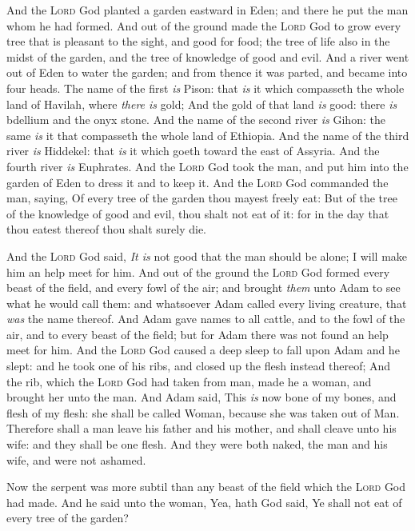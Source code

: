 \documentclass[11pt,letterpaper,oneside]{memoir}
\begin{document}
And the \textsc{Lord} God planted a garden eastward in Eden; and there he
put the man whom he had formed. And out of the ground made the
\textsc{Lord} God to grow every tree that is pleasant to the sight, and
good for food; the tree of life also in the midst of the garden, and the
tree of knowledge of good and evil. And a river went out of Eden to
water the garden; and from thence it was parted, and became into four
heads. The name of the first \emph{is} Pison: that \emph{is} it which
compasseth the whole land of Havilah, where \emph{there is} gold; And
the gold of that land \emph{is} good: there \emph{is} bdellium and the
onyx stone. And the name of the second river \emph{is} Gihon: the same
\emph{is} it that compasseth the whole land of Ethiopia. And the name of
the third river \emph{is} Hiddekel: that \emph{is} it which goeth toward
the east of Assyria. And the fourth river \emph{is} Euphrates. And the
\textsc{Lord} God took the man, and put him into the garden of Eden to
dress it and to keep it. And the \textsc{Lord} God commanded the man,
saying, Of every tree of the garden thou mayest freely eat: But of the
tree of the knowledge of good and evil, thou shalt not eat of it: for in
the day that thou eatest thereof thou shalt surely die.

And the \textsc{Lord} God said, \emph{It is} not good that the man should
be alone; I will make him an help meet for him. And out of the ground
the \textsc{Lord} God formed every beast of the field, and every fowl of
the air; and brought \emph{them} unto Adam to see what he would call
them: and whatsoever Adam called every living creature, that \emph{was}
the name thereof. And Adam gave names to all cattle, and to the fowl of
the air, and to every beast of the field; but for Adam there was not
found an help meet for him. And the \textsc{Lord} God caused a deep sleep
to fall upon Adam and he slept: and he took one of his ribs, and closed
up the flesh instead thereof; And the rib, which the \textsc{Lord} God had
taken from man, made he a woman, and brought her unto the man. And Adam
said, This \emph{is} now bone of my bones, and flesh of my flesh: she
shall be called Woman, because she was taken out of Man. Therefore shall
a man leave his father and his mother, and shall cleave unto his wife:
and they shall be one flesh. And they were both naked, the man and his
wife, and were not ashamed.

Now the serpent was more subtil than any beast of the field which the
\textsc{Lord} God had made. And he said unto the woman, Yea, hath God
said, Ye shall not eat of every tree of the garden?
\end{document}
